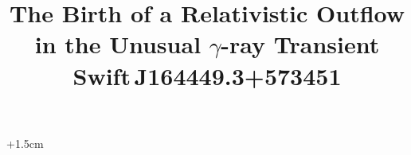 
\textwidth16cm\voffset-2.3cm\hoffset+1.5cm
\voffset-1cm

\def\simlt{\mathrel{\hbox{\rlap{\hbox{\lower4pt\hbox{$\sim$}}}\hbox{$<$}}}}
\def\simgt{\mathrel{\hbox{\rlap{\hbox{\lower4pt\hbox{$\sim$}}}\hbox{$>$}}}}

\def\ale{\mathrel{\hbox{\rlap{\hbox{\lower4pt\hbox{$\sim$}}}\hbox{$<$}}}}
\def\age{\mathrel{\hbox{\rlap{\hbox{\lower4pt\hbox{$\sim$}}}\hbox{$>$}}}}

\def\nodata{---}

\def\ra#1#2#3{#1$^{\rm h}$#2$^{\rm m}$#3$^{\rm s}$}
\def\dec#1#2#3{$#1^\circ#2'#3''$}

\newcommand{\hst}{\textit{HST}}
\newcommand{\swift}{\textit{Swift}}
\newcommand{\ergcms}{erg cm$^{-2}$ s$^{-1}$}
\newcommand{\uJy}{\mbox{$\mu$Jy}}
\newcommand{\Tburst}{\mbox{$T_{\rm GRB}$}}

\def\spose#1{\hbox to 0pt{#1\hss}}



\title{\large \bf The Birth of a Relativistic Outflow in the Unusual
$\gamma$-ray Transient Swift\,J164449.3+573451}

